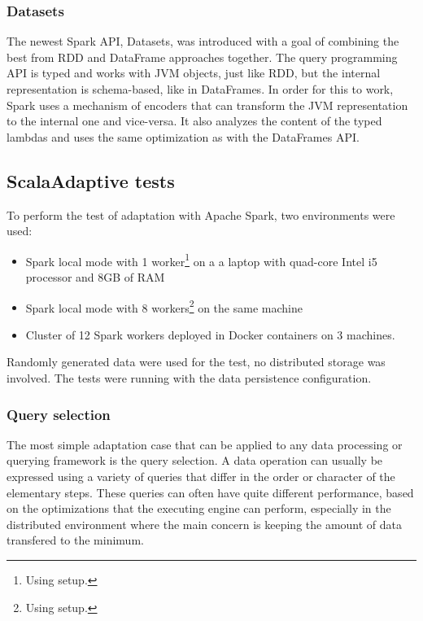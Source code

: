 \subsubsection{Datasets}

The newest Spark API, Datasets, was introduced with a goal of combining the best from RDD and DataFrame approaches together. The query programming API is typed and works with JVM objects, just like RDD, but the internal representation is schema-based, like in DataFrames. In order for this to work, Spark uses a mechanism of encoders that can transform the JVM representation to the internal one and vice-versa. It also analyzes the content of the typed lambdas and uses the same optimization as with the DataFrames API.

\subsection{ScalaAdaptive tests}

To perform the test of adaptation with Apache Spark, two environments were used:

\begin{itemize}
	\item Spark local mode with 1 worker\footnote{Using  setup.} on a a laptop with quad-core Intel i5 processor and 8GB of RAM
	\item Spark local mode with 8 workers\footnote{Using  setup.} on the same machine
	\item Cluster of 12 Spark workers deployed in Docker containers on 3 machines. 	%
\end{itemize}

Randomly generated data were used for the test, no distributed storage was involved. The tests were running with the  data persistence configuration.

\subsubsection{Query selection}

The most simple adaptation case that can be applied to any data processing or querying framework is the query selection. A data operation can usually be expressed using a variety of queries that differ in the order or character of the elementary steps. These queries can often have quite different performance, based on the optimizations that the executing engine can perform, especially in the distributed environment where the main concern is keeping the amount of data transfered to the minimum.

